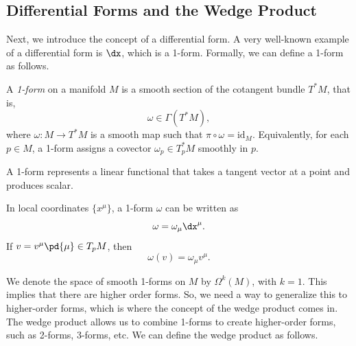 

\subsection{Differential Forms and the Wedge Product} Next, we introduce the concept of a differential form. A very well-known example of a differential form is $\dx$, which is a 1-form. Formally, we can define a 1-form as follows.

\begin{definition}
  A \emph{1-form} on a manifold $M$ is a smooth section of the cotangent bundle $T^*M$, that is,
  \[%
    \omega \in \Gamma(T^*M)
  ,\]%
  where $\omega : M \to T^*M$ is a smooth map such that $\pi \circ \omega = \mathrm{id}_M$. Equivalently, for each $p \in M$, a 1-form assigns a covector $\omega_p \in T_p^*M$ smoothly in $p$.
\end{definition}

A 1-form represents a linear functional that takes a tangent vector at a point and produces scalar.

\begin{example}
  In local coordinates $\{x^\mu\}$, a 1-form $\omega$ can be written as
  \[%
    \omega = \omega_\mu \dx^\mu
  .\]%
  If $v = v^\mu \pd{\mu} \in T_pM$, then
  \[%
    \omega(v) = \omega_\mu v^\mu
  .\]%
\end{example}

We denote the space of smooth 1-forms on $M$ by $\Omega^k(M)$, with $k = 1$. This implies that there are higher order forms. So, we need a way to generalize this to higher-order forms, which is where the concept of the wedge product comes in. The wedge product allows us to combine 1-forms to create higher-order forms, such as 2-forms, 3-forms, etc. We can define the wedge product as follows.

